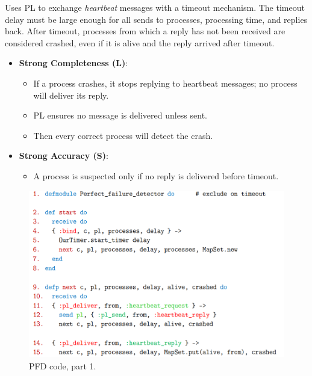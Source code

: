 \documentclass[11pt]{article}
\begin{document}
Uses PL to exchange \textit{heartbeat} messages with a timeout mechanism.
The timeout delay must be large enough for all sends to processes, processing time, and replies back.
After timeout, processes from which a reply has not been received are considered crashed, even if it is alive and the reply arrived after timeout.

\begin{itemize}
  \item \textbf{Strong Completeness (L)}:
    \begin{itemize}
      \item If a process crashes, it stops replying to heartbeat messages; no process will deliver its reply.
      \item PL ensures no message is delivered unless sent.
      \item Then every correct process will detect the crash.
    \end{itemize}
  \item \textbf{Strong Accuracy (S)}:
    \begin{itemize}
      \item A process is suspected only if no reply is delivered before timeout.
    \end{itemize}
\end{itemize}

\begin{figure}[htb!]
  \centering
  \caption{PFD code, part 1.}
  \includegraphics[scale=0.3]{pfdcode1}
\end{figure}
\end{document}
